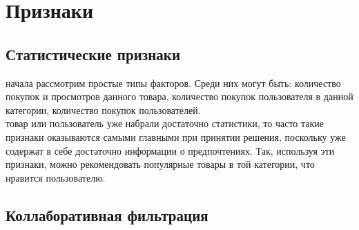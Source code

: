 \documentclass{article}
\newcommand\tab[1][1cm]{\hspace*{#1}}
\begin{document}
\section*{Признаки}
\subsection*{Статистические признаки}

 начала рассмотрим простые типы факторов. Среди них могут быть: количество покупок и просмотров данного товара, количество покупок пользователя в данной категории, количество покупок пользователей.\\
 товар или пользователь уже набрали достаточно статистики, то часто такие признаки оказываются самыми главными при принятии решения, поскольку уже содержат в себе достаточно информации о предпочтениях. Так, используя эти признаки, можно рекомендовать популярные товары в той категории, что нравится пользователю.

\subsection*{Коллаборативная фильтрация}
\end{document}
